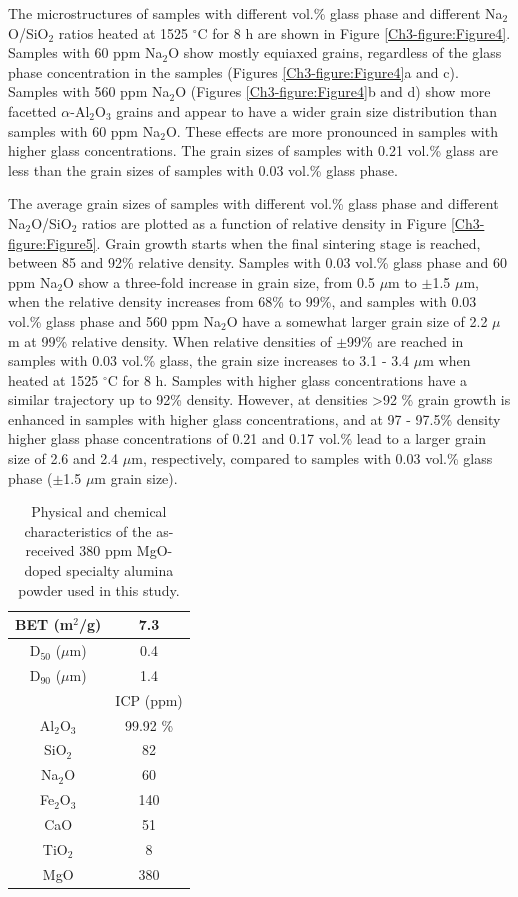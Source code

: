 The microstructures of samples with different vol.\% glass phase and different Na$_{2}$O/SiO$_{2}$ ratios heated at 1525 $^{\circ}$C for 8 h are shown in Figure \ref{Ch3-figure:Figure4}. Samples with 60 ppm Na$_{2}$O show mostly equiaxed grains, regardless of the glass phase concentration in the samples (Figures \ref{Ch3-figure:Figure4}a and c). Samples with 560 ppm Na$_{2}$O (Figures  \ref{Ch3-figure:Figure4}b and d) show more facetted $\alpha$-Al$_{2}$O$_{3}$ grains and appear to have a wider grain size distribution than samples with 60 ppm Na$_{2}$O. These effects are more pronounced in samples with higher glass concentrations. The grain sizes of samples with 0.21 vol.\% glass are less than the grain sizes of samples with 0.03 vol.\% glass phase. 

The average grain sizes of samples with different vol.\% glass phase and different Na$_{2}$O/SiO$_{2}$ ratios are plotted as a function of relative density in Figure \ref{Ch3-figure:Figure5}. Grain growth starts when the final sintering stage is reached, between 85 and 92\% relative density. Samples with 0.03 vol.\% glass phase and 60 ppm Na$_{2}$O show a three-fold increase in grain size, from 0.5 $\mu$m to $\pm$1.5 $\mu$m, when the relative density increases from 68\% to 99\%, and samples with 0.03 vol.\% glass phase and 560 ppm Na$_{2}$O have a somewhat larger grain size of 2.2 $\mu$m at 99\% relative density. When relative densities of $\pm$99\% are reached in samples with 0.03 vol.\% glass, the grain size increases to 3.1 - 3.4 $\mu$m when heated at 1525 $^{\circ}$C for 8 h. Samples with higher glass concentrations have a similar trajectory up to 92\% density. However, at densities >92 \% grain growth is enhanced in samples with higher glass concentrations, and at 97 - 97.5\% density higher glass phase concentrations of 0.21 and 0.17 vol.\% lead to a larger grain size of 2.6 and 2.4 $\mu$m, respectively, compared to samples with 0.03 vol.\% glass phase ($\pm$1.5 $\mu$m grain size). 



\newpage
\begin{table}[H]
	\caption{Physical and chemical characteristics of the as-received 380 ppm MgO-doped specialty alumina powder used in this study.}
	\centering
	\begin{tabular}{ | c | c | }
			\hline
			BET (m$^{2}$/g) & 7.3 \\
			\hline
			D$_{50}$ ($\mu$m) & 0.4 \\
			\hline
			D$_{90}$ ($\mu$m) & 1.4 \\
			\hline
			 & ICP (ppm) \\
			\hline
			Al$_{2}$O$_{3}$ & 99.92 \% \\
			\hline
			SiO$_{2}$ & 82 \\
			\hline
			Na$_{2}$O & 60 \\
			\hline
			Fe$_{2}$O$_{3}$ & 140 \\
			\hline
			CaO & 51 \\
			\hline
			TiO$_{2}$ & 8 \\
			\hline
			MgO & 380 \\
			\hline
	\end{tabular}
	\label{Ch3-table:table1}
\end{table}
\clearpage

